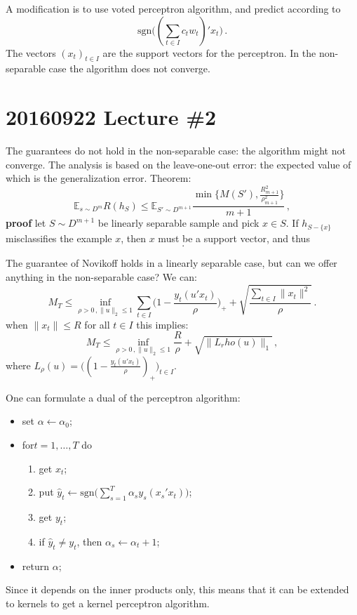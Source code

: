 \documentclass[a4paper]{article}
\newcommand{\ex}{\mathbb{E}}
\begin{document}
A modification is to use voted perceptron algorithm, and predict according to
\[ \text{sgn} \bigl( (\sum_{t\in I} c_t w_t)' x_t \bigr) \,. \]
The vectors $(x_t)_{t\in I}$ are the support vectors for the perceptron. In the
non-separable case the algorithm does not converge.



\section{20160922 Lecture \#2} %
\label{sec:20160922_lecture_2}

The guarantees do not hold in the non-separable case: the algorithm might not converge.
The analysis is based on the leave-one-out error: the expected value of which is
the generalization error.
Theorem:
\[\ex_{s\sim D^m} R(h_S)
    \leq \ex_{S'\sim D^{m+1}} \frac{\min\{M(S'), \frac{R^2_{m+1}}{\rho^2_{m+1}}\}}{m+1}
    \,, \]
\textbf{proof} let $S\sim D^{m+1}$ be linearly separable sample and pick $x\in S$.
If $h_{S-\{x\}}$ misclassifies the example $x$, then $x$ must be a support vector,
and thus
\[ \,.\]

The guarantee of Novikoff holds in a linearly separable case, but can we offer anything
in the non-separable case? We can:
\[ M_T \leq \inf_{\rho>0\,,\|u\|_2\leq 1}
    \sum_{t\in I} \bigl( 1-\frac{y_t (u'x_t)}{\rho}\bigr)_+
        + \sqrt{\frac{\sum_{t\in I} \|x_t\|^2}{\rho}}
    \,. \]
when $\|x_t\|\leq R$ for all $t\in I$ this implies:
\[ M_T \leq \inf_{\rho>0\,,\|u\|_2\leq 1}
    \frac{R}{\rho} + \sqrt{\|L_rho(u)\|_1}
    \,, \]
where $L_\rho(u) = \bigl((1-\frac{y_t (u'x_t)}{\rho})_+\bigr)_{t\in I}$.

One can formulate a dual of the perceptron algorithm:\begin{itemize}
    \item set $\alpha\leftarrow \alpha_0$;
    \item for$t=1,\ldots, T$ do \begin{enumerate}
        \item get $x_t$;
        \item put $\hat{y}_t \leftarrow \text{sgn}\bigl(\sum_{s=1}^T \alpha_s y_s (x_s' x_t)\bigr)$;
        \item get $y_t$;
        \item if $\hat{y}_t\neq y_t$, then $\alpha_s \leftarrow \alpha_t + 1$;
    \end{enumerate}
    \item return $\alpha$;
\end{itemize}
Since it depends on the inner products only, this means that it can be extended
to kernels to get a kernel perceptron algorithm.
\end{document}

